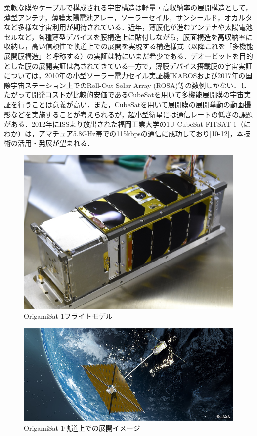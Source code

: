 柔軟な膜やケーブルで構成される宇宙構造は軽量・高収納率の展開構造として，薄型アンテナ，薄膜太陽電池アレー，ソーラーセイル，サンシールド，オカルタなど多様な宇宙利用が期待されている．近年，薄膜化が進むアンテナや太陽電池セルなど，各種薄型デバイスを膜構造上に貼付しながら，膜面構造を高収納率に収納し，高い信頼性で軌道上での展開を実現する構造様式（以降これを「多機能展開膜構造」と呼称する）の実証は特にいまだ希少である．デオービットを目的とした膜の展開実証は為されてきている一方で，薄膜デバイス搭載膜の宇宙実証については，2010年の小型ソーラー電力セイル実証機IKAROSおよび2017年の国際宇宙ステーション上でのRoll-Out Solar Array (ROSA)等の数例しかない．したがって開発コストが比較的安価であるCubeSatを用いて多機能展開膜の宇宙実証を行うことは意義が高い．また，CubeSatを用いて展開膜の展開挙動の動画撮影などを実施することが考えられるが，超小型衛星には通信レートの低さの課題がある．2012年にISSより放出された福岡工業大学の1U CubeSat FITSAT-1（にわか）は，アマチュア5.8GHz帯での115kbpsの通信に成功しており[10-12]，本技術の活用・発展が望まれる．
\begin{figure}[H]
	\centering
	\includegraphics[width=0.7\linewidth]{01/fig/1-1-1.jpg}
	\caption{OrigamiSat-1フライトモデル}
	\label{fig1-1-1}
\end{figure}
\begin{figure}[H]
	\centering
	\includegraphics[width=1\linewidth]{01/fig/1-1-2.jpg}
	\caption{OrigamiSat-1軌道上での展開イメージ}
	\label{fig1-1-2}
\end{figure}

